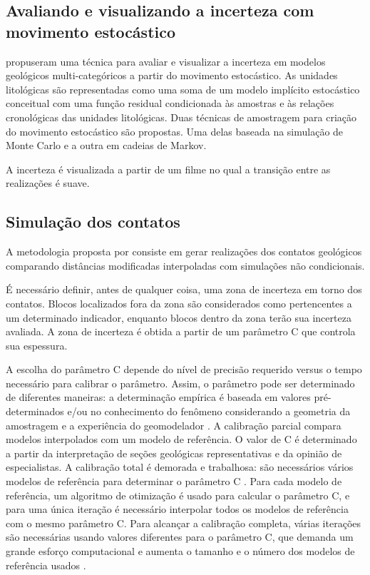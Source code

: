 \subsection{Avaliando e visualizando a incerteza com movimento estocástico}

 propuseram uma técnica para avaliar e visualizar a incerteza em modelos geológicos multi-categóricos a partir do movimento estocástico. As unidades litológicas são representadas como uma soma de um modelo implícito estocástico conceitual com uma função residual condicionada às amostras e às relações cronológicas das unidades litológicas. Duas técnicas de amostragem para criação do movimento estocástico são propostas. Uma delas baseada na simulação de Monte Carlo e a outra em cadeias de Markov.

A incerteza é visualizada a partir de um filme no qual a transição entre as realizações é suave.

\subsection{Simulação dos contatos}\label{boundsim}

A metodologia proposta por  consiste em gerar realizações dos contatos geológicos comparando distâncias modificadas interpoladas com simulações não condicionais. 

É necessário definir, antes de qualquer coisa, uma zona de incerteza em torno dos contatos. Blocos localizados fora da zona são considerados como pertencentes a um determinado indicador, enquanto blocos dentro da zona terão sua incerteza avaliada. A zona de incerteza é obtida a partir de um parâmetro C que controla sua espessura.

A escolha do parâmetro C depende do nível de precisão requerido versus o tempo necessário para calibrar o parâmetro. Assim, o parâmetro pode ser determinado de diferentes maneiras: a determinação empírica é baseada em valores pré-determinados e/ou no conhecimento do fenômeno considerando a geometria da amostragem e a experiência do geomodelador \cite{kaperov}. A calibração parcial compara modelos interpolados com um modelo de referência. O valor de C é determinado a partir da interpretação de seções geológicas representativas e da opinião de especialistas. A calibração total é demorada e trabalhosa: são necessários vários modelos de referência para determinar o parâmetro C \cite{kaperov}. Para cada modelo de referência, um algoritmo de otimização é usado para calcular o parâmetro C, e para uma única iteração é necessário interpolar todos os modelos de referência com o mesmo parâmetro C. Para alcançar a calibração completa, várias iterações são necessárias usando valores diferentes para o parâmetro C, que demanda um grande esforço computacional e aumenta o tamanho e o número dos modelos de referência usados \cite{munroe2008full}.

